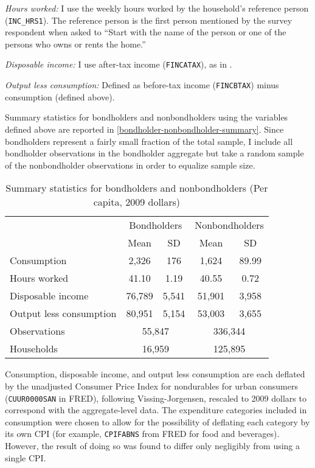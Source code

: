 \textit{Hours worked:} I use the weekly hours worked by the household's reference person (\texttt{INC\_HRS1}). The reference person is the first person mentioned by the survey respondent when asked to ``Start with the name of the person or one of the persons who owns or rents the home.''

\textit{Disposable income:}  I use after-tax income (\texttt{FINCATAX}), as in \cite{krueger15}.

\textit{Output less consumption:} Defined as before-tax income (\texttt{FINCBTAX}) minus consumption (defined above).

Summary statistics for bondholders and nonbondholders using the variables defined above are reported in \autoref{bondholder-nonbondholder-summary}. Since bondholders represent a fairly small fraction of the total sample, I include all bondholder observations in the bondholder aggregate but take a random sample of the nonbondholder observations in order to equalize sample size.

\begin{table}[t]
\centering
\caption{Summary statistics for bondholders and nonbondholders (Per capita, 2009 dollars)}
\label{bondholder-nonbondholder-summary}
\begin{tabular}{lcccc} \hline
& \multicolumn{2}{c}{Bondholders} & \multicolumn{2}{c}{Nonbondholders} \\
& Mean & SD & Mean & SD \\ \hline
Consumption             & 2,326  & 176   & 1,624  & 89.99 \\
Hours worked            & 41.10  & 1.19  & 40.55  & 0.72 \\
Disposable income       & 76,789 & 5,541 & 51,901 & 3,958 \\
Output less consumption & 80,951 & 5,154 & 53,003 & 3,655 \\ \hline
Observations            & \multicolumn{2}{c}{55,847} & \multicolumn{2}{c}{336,344} \\
Households              & \multicolumn{2}{c}{16,959} & \multicolumn{2}{c}{125,895} \\ \hline
\end{tabular}
\end{table}

Consumption, disposable income, and output less consumption are each deflated by the unadjusted Consumer Price Index for nondurables for urban consumers (\texttt{CUUR0000SAN} in FRED), following Vissing-Jorgensen, rescaled to 2009 dollars to correspond with the aggregate-level data. The expenditure categories included in consumption were chosen to allow for the possibility of deflating each category by its own CPI (for example, \texttt{CPIFABNS} from FRED for food and beverages). However, the result of doing so was found to differ only negligibly from using a single CPI.

